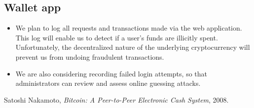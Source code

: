 \documentclass[a4paper,12pt]{article}
\begin{document}
\subsection{Wallet app}

\begin{itemize}
  \item We plan to log all requests and transactions made via the web application. This log will enable us to detect if a user's funds are illicitly spent. Unfortunately, the decentralized nature of the underlying cryptocurrency will prevent us from undoing fraudulent transactions.
  \item We are also considering recording failed login attempts, so that administrators can review and assess online guessing attacks.
\end{itemize}


\begin{thebibliography}{9}
  Satoshi Nakamoto,
  \emph{Bitcoin: A Peer-to-Peer Electronic Cash System},
  2008.
\end{thebibliography}
\end{document}
